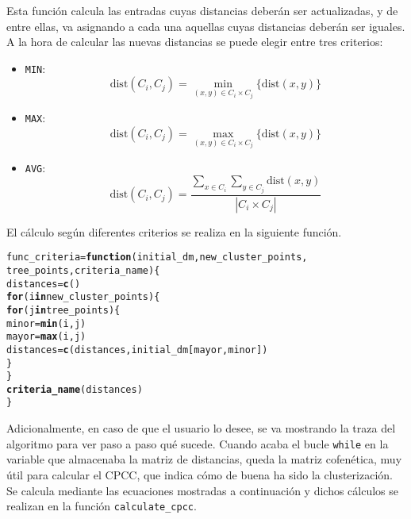 \documentclass[12pt]{report}\usepackage[]{graphicx}\usepackage[dvipsnames]{xcolor}
\makeatletter
\newcommand{\hlstd}[1]{\textcolor[rgb]{0.345,0.345,0.345}{#1}}%
\newcommand{\hlkwa}[1]{\textcolor[rgb]{0.161,0.373,0.58}{\textbf{#1}}}%
\newcommand{\hlkwb}[1]{\textcolor[rgb]{0.69,0.353,0.396}{#1}}%
\newcommand{\hlkwc}[1]{\textcolor[rgb]{0.333,0.667,0.333}{#1}}%
\newcommand{\hlkwd}[1]{\textcolor[rgb]{0.737,0.353,0.396}{\textbf{#1}}}%
\newenvironment{kframe}{%
 \def\at@end@of@kframe{}%
 \ifinner\ifhmode%
  \def\at@end@of@kframe{\end{minipage}}%
  \begin{minipage}{\columnwidth}%
 \fi\fi%
 \def\FrameCommand##1{\hskip\@totalleftmargin \hskip-\fboxsep
 \colorbox{shadecolor}{##1}\hskip-\fboxsep
     \hskip-\linewidth \hskip-\@totalleftmargin \hskip\columnwidth}%
 \MakeFramed {\advance\hsize-\width
   \@totalleftmargin\z@ \linewidth\hsize
   \@setminipage}}%
 {\par\unskip\endMakeFramed%
 \at@end@of@kframe}
\newenvironment{knitrout}{}{} %
\newcommand{\dt}{\text{dist}}
\makeatother
\begin{document}
		 		Esta función calcula las entradas cuyas distancias deberán ser actualizadas, y de entre ellas, va asignando a cada una aquellas cuyas distancias deberán ser iguales. A la hora de calcular las nuevas distancias se puede elegir entre tres criterios: 
		 		
		 		\begin{itemize}
		 			\item \texttt{MIN}: 
		 			$$
		 			\dt(C_i, C_j) = \min_{(x, y) \in C_i \times C_j}\{\dt(x, y)\}
		 			$$
		 			\item \texttt{MAX}: 
		 			$$
		 			\dt(C_i, C_j) = \max_{(x, y) \in C_i \times C_j}\{\dt(x, y)\}
		 			$$
		 			\item \texttt{AVG}: 
		 			$$
		 			\dt(C_i, C_j) = \frac{\displaystyle\sum_{x \in C_i}\sum_{y \in C_j} \dt(x, y)}{|C_i \times C_j|}
		 			$$
		 		\end{itemize}
		 		
		 		El cálculo según diferentes criterios se realiza en la siguiente función. 
		 		
\begin{knitrout}
\color{fgcolor}\begin{kframe}
\begin{alltt}
\hlstd{func_criteria} \hlkwb{=} \hlkwa{function}\hlstd{(}\hlkwc{initial_dm}\hlstd{,} \hlkwc{new_cluster_points}\hlstd{,}
        \hlkwc{tree_points}\hlstd{,} \hlkwc{criteria_name}\hlstd{) \{}
        \hlstd{distances} \hlkwb{=} \hlkwd{c}\hlstd{()}
        \hlkwa{for} \hlstd{(i} \hlkwa{in} \hlstd{new_cluster_points) \{}
                \hlkwa{for} \hlstd{(j} \hlkwa{in} \hlstd{tree_points) \{}
                        \hlstd{minor} \hlkwb{=} \hlkwd{min}\hlstd{(i, j)}
                        \hlstd{mayor} \hlkwb{=} \hlkwd{max}\hlstd{(i, j)}
                        \hlstd{distances} \hlkwb{=} \hlkwd{c}\hlstd{(distances, initial_dm[mayor, minor])}
                \hlstd{\}}
        \hlstd{\}}
        \hlkwd{criteria_name}\hlstd{(distances)}
\hlstd{\}}
\end{alltt}
\end{kframe}
\end{knitrout}
		 		
		 		Adicionalmente, en caso de que el usuario lo desee, se va mostrando la traza del algoritmo para ver paso a paso qué sucede. Cuando acaba el bucle \texttt{while} en la variable que almacenaba la matriz de distancias, queda la matriz cofenética, muy útil para calcular el CPCC, que indica cómo de buena ha sido la clusterización. Se calcula mediante las ecuaciones mostradas a continuación y dichos cálculos se realizan en la función \texttt{calculate\_cpcc}. 
		 		
\end{document}
